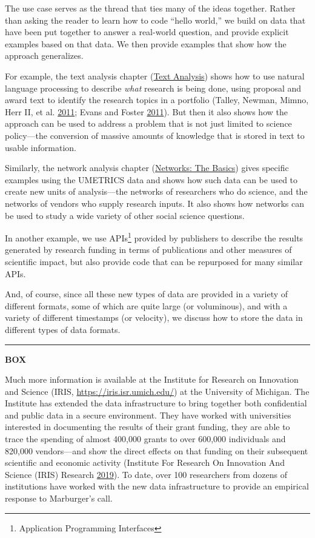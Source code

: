 \documentclass[]{krantz}
\begin{document}
The use case serves as the thread that ties many of the ideas together.
Rather than asking the reader to learn how to code ``hello world,'' we
build on data that have been put together to answer a real-world
question, and provide explicit examples based on that data. We then
provide examples that show how the approach generalizes.

For example, the text analysis chapter
(\protect\hyperlink{chap:text}{Text Analysis}) shows how to use natural
language processing to describe \emph{what} research is being done,
using proposal and award text to identify the research topics in a
portfolio (Talley, Newman, Mimno, Herr II, et al.
\protect\hyperlink{ref-talley2011database}{2011}; Evans and Foster
\protect\hyperlink{ref-Evans2011}{2011}). But then it also shows how the
approach can be used to address a problem that is not just limited to
science policy---the conversion of massive amounts of knowledge that is
stored in text to usable information.

Similarly, the network analysis chapter
(\protect\hyperlink{chap:networks}{Networks: The Basics}) gives specific
examples using the UMETRICS data and shows how such data can be used to
create new units of analysis---the networks of researchers who do
science, and the networks of vendors who supply research inputs. It also
shows how networks can be used to study a wide variety of other social
science questions.

In another example, we use APIs\footnote{Application Programming
  Interfaces} provided by publishers to describe the results generated
by research funding in terms of publications and other measures of
scientific impact, but also provide code that can be repurposed for many
similar APIs.

And, of course, since all these new types of data are provided in a
variety of different formats, some of which are quite large (or
voluminous), and with a variety of different timestamps (or velocity),
we discuss how to store the data in different types of data formats.

\begin{center}\rule{0.5\linewidth}{\linethickness}\end{center}

\textbf{BOX}

Much more information is available at the Institute for Research on
Innovation and Science (IRIS, \url{https://iris.isr.umich.edu/}) at the
University of Michigan. The Institute has extended the data
infrastructure to bring together both confidential and public data in a
secure environment. They have worked with universities interested in
documenting the results of their grant funding, they are able to trace
the spending of almost 400,000 grants to over 600,000 individuals and
820,000 vendors---and show the direct effects on that funding on their
subsequent scientific and economic activity (Institute For Research On
Innovation And Science (IRIS) Research
\protect\hyperlink{ref-InstituteForResearchOnInnovationAndScienceIRISResearch2019}{2019}).
To date, over 100 researchers from dozens of institutions have worked
with the new data infrastructure to provide an empirical response to
Marburger's call.
\end{document}
